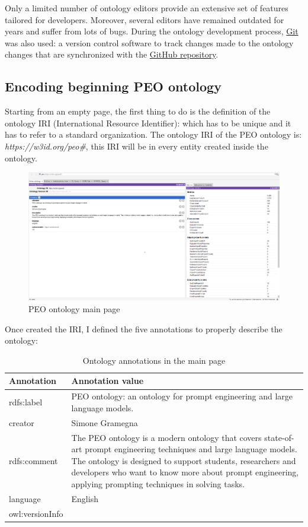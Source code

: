 Only a limited number of ontology editors provide an extensive set of features tailored for developers. Moreover, several editors have remained outdated for years and suffer from lots of bugs. During the ontology development process, \href{https://git-scm.com/}{Git} was also used: a version control software to track changes made to the ontology changes that are synchronized with the \href{https://github.com/simonegramegna/peo}{GitHub repository}.
\subsection{Encoding beginning PEO ontology}
Starting from an empty page, the first thing to do is the definition of the ontology IRI (International Resource Identifier): which has to be unique and it has to refer to a standard organization. The ontology IRI of the PEO ontology is: \textit{https://w3id.org/peo\#}, this IRI will be in every entity created inside the ontology.
\begin{figure}[H]
    \centering
    \includegraphics[width=0.8\linewidth]{Figures/fig_29.png}
    \caption{PEO ontology main page}
    \label{fig:enter-label}
\end{figure}
Once created the IRI, I defined the five annotations to properly describe the ontology:
\begin{table}[H]
    \centering
    \begin{tabular}{|>{\raggedright\arraybackslash}p{6cm}|>{\raggedright\arraybackslash}p{6cm}|}
        \hline
        \textbf{Annotation} & \textbf{Annotation value} \\ \hline
         rdfs:label & PEO ontology: an ontology for prompt 
         engineering and large language models. \\ \hline
         
         creator & Simone Gramegna\\ \hline
         
         rdfs:comment & The PEO ontology is a modern ontology that covers state-of-art prompt engineering techniques and large language models. The ontology is designed to support students, researchers and developers who want to know more about prompt engineering, applying prompting techniques in solving tasks. \\ \hline
         
         language & English \\ \hline
         
         owl:versionInfo & 1.0 \\ \hline
    \end{tabular}
    \caption{Ontology annotations in the main page}
\end{table}

